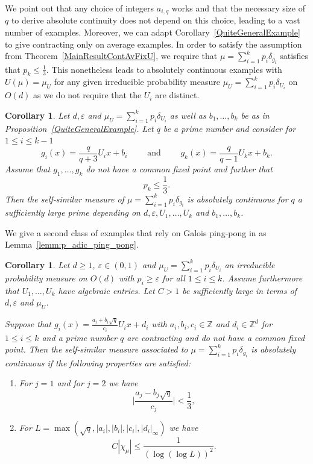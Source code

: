 \documentclass[10pt, english,oneside,reqno]{amsart}
\theoremstyle{plain}
\newtheorem{corollary}[theorem]{Corollary}
\theoremstyle{remark}
\numberwithin{equation}{section}
\numberwithin{figure}{section}
\newcommand{\eps}{\varepsilon}
\newcommand{\Z}{\mathbb{Z}}
\begin{document}
    We point out that any choice of integers $a_{i,q}$ works and that the necessary size of $q$ to derive absolute continuity does not depend on this choice, leading to a vast number of examples. Moreover, we can adapt Corollary~\ref{QuiteGeneralExample} to give contracting only on average examples. In order to satisfy the assumption from Theorem~\ref{MainResultContAvFixU}, we require that $\mu = \sum_{i = 1}^k p_i \delta_{g_i}$ satisfies that $p_k \leq \frac{1}{3}$. This nonetheless leads to absolutely continuous examples with $U(\mu) = \mu_U$ for any given irreducible probability measure $\mu_U = \sum_{i = 1}^k p_i\delta_{U_i}$ on $O(d)$ as we do not require that the $U_i$ are distinct.

    \begin{corollary}\label{QuiteGeneralContAvExample}
    Let $d, \eps$ and $\mu_U = \sum_{i = 1}^k p_i \delta_{U_i}$  as well as $b_1, \ldots , b_k$ be as in Proposition~\ref{QuiteGeneralExample}. Let $q$ be a prime number and  consider for $1 \leq i \leq k-1$ $$g_i(x) = \frac{q}{q+3}U_ix + b_i \quad \quad \text{ and } \quad \quad g_k(x) = \frac{q}{q-1}U_kx + b_k.$$ Assume that $g_1, \ldots , g_k$ do not have a common fixed point and further that $$p_k \leq \frac{1}{3}.$$ Then the self-similar measure of $\mu = \sum_{i = 1}^k p_i\delta_{g_i}$ is absolutely continuous for $q$ a sufficiently large prime depending on $d,\eps,U_1, \ldots , U_k$ and $b_1, \ldots , b_k$.
    \end{corollary}
    
    We give a second class of examples that rely on Galois ping-pong in as Lemma~\ref{lemm:p_adic_ping_pong}.

    \begin{corollary}\label{MostGeneralExample}
        Let $d \geq 1$, $\eps \in (0,1)$ and $\mu_U = \sum_{i = 1}^k p_i\delta_{U_i}$ an irreducible probability measure on $O(d)$ with $p_i \geq \eps$ for all $1\leq i \leq k$. Assume furthermore that $U_1, \ldots , U_k$ have algebraic entries. Let $C > 1$ be sufficiently large in terms of $d,\eps$ and $\mu_U$.  
        
        Suppose that $g_i(x) = \frac{a_i + b_i\sqrt{q}}{c_i}U_ix + d_i$ with $a_i, b_i, c_i \in \Z$ and $d_i \in \Z^d$ for $1 \leq i \leq k$ and a prime number $q$ are contracting and do not have a common fixed point. Then the self-similar measure associated to $\mu = \sum_{i = 1}^k p_i\delta_{g_i}$ is absolutely continuous if the following properties are satisfied: 
        \begin{enumerate}[label = (\roman*)]
            \item For $j = 1$ and for $j = 2$ we have $$\bigg|\frac{a_j - b_j\sqrt{q}}{c_j}\bigg| < \frac{1}{3},$$
            \item For $L = \max(\sqrt{q}, |a_i|, |b_i|, |c_i|, |d_i|_{\infty})$ we have $$C|\chi_{\mu}| \leq \frac{1}{(\log(\log L))^2}.$$
        \end{enumerate}
    \end{corollary}
\end{document}
